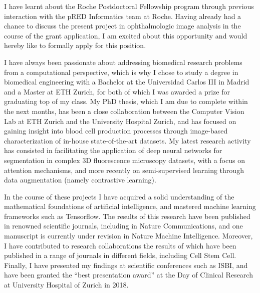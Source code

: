 \documentclass[10pt, letter]{ag-cv} %
\begin{document}
\makecvheader %

\makelettertitle %


\begin{cvletter}






\begin{flushleft}
I have learnt about the Roche Postdoctoral Fellowship program through previous interaction with the pRED Informatics team at Roche. Having already had a chance to discuss the present project in ophthalmologic image analysis in the course of the grant application, I am excited about this opportunity and would hereby like to formally apply for this position. 

I have always been passionate about addressing biomedical research problems from a computational perspective, which is why I chose to study a degree in biomedical engineering with a Bachelor at the Universidad Carlos III in Madrid and a Master at ETH Zurich, for both of which I was awarded a prize for graduating top of my class. My PhD thesis, which I am due to complete within the next months, has been a close collaboration between the Computer Vision Lab at ETH Zurich and the University Hospital Zurich, and has focused on gaining insight into blood cell production processes through image-based characterization of in-house state-of-the-art datasets. My latest research activity has consisted in facilitating the application of deep neural networks for segmentation in complex 3D fluorescence microscopy datasets, with a focus on attention mechanisms, and more recently on semi-supervised learning through data augmentation (namely contrastive learning). 

In the course of these projects I have acquired a solid understanding of the mathematical foundations of artificial intelligence, and mastered machine learning frameworks such as Tensorflow. The results of this research have been published in renowned scientific journals, including in Nature Communications, and one manuscript is currently under revision in Nature Machine Intelligence. Moreover, I have contributed to research collaborations the results of which have been published in a range of journals in different fields, including Cell Stem Cell. Finally, I have presented my findings at scientific conferences such as ISBI, and have been granted the “best presentation award” at the Day of Clinical Research at University Hospital of Zurich in 2018. 


\end{flushleft}
\end{cvletter}
\end{document}
